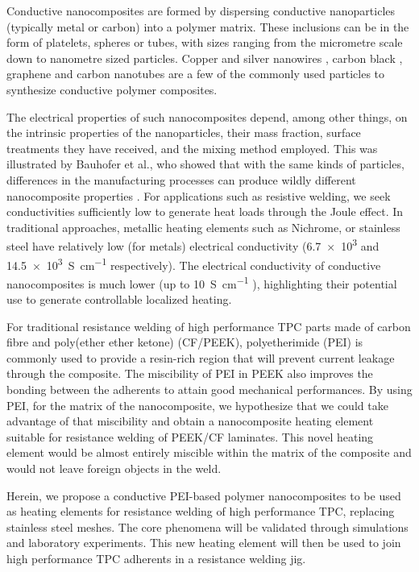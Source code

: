 \documentclass[11pt,review,times]{elsarticle}
\begin{document}
Conductive nanocomposites are formed by dispersing conductive nanoparticles (typically metal or carbon) into a polymer matrix. 
These inclusions can be in the form of platelets, spheres or tubes, with sizes ranging from the micrometre scale down to nanometre sized particles. 
Copper and silver nanowires \cite{Gelves2008a, Al-Saleh2011, Li2015a, Riviere2016, DermanakiFarahani2016, Cauchy2017}, carbon black \cite{Jin2013, MohdRadzuan2017}, graphene \cite{Jiang2012a, Hu2014a} and carbon nanotubes \cite{Diez-Pascual2011,Huegun2013,Kazakova2014,Jia2015} are a few of the commonly used particles to synthesize conductive polymer composites.

The electrical properties of such nanocomposites depend, among other things, on the intrinsic properties of the nanoparticles, their mass fraction, surface treatments they have received, and the mixing method employed. 
This was illustrated by Bauhofer et al., who showed that with the same kinds of particles, differences in the manufacturing processes can produce wildly different nanocomposite properties \cite{Bauhofer2009}. 
For applications such as resistive welding, we seek conductivities sufficiently low to generate heat loads through the Joule effect. 
In traditional approaches, metallic heating elements such as Nichrome, or stainless steel have relatively low (for metals) electrical conductivity (\num{6.7e3} and \SI{14.5e3}{\siemens\per\centi\metre} respectively). 
The electrical conductivity of conductive nanocomposites is much lower (up to \SI{10}{\siemens\per\centi\metre} \cite{Grossiord2008a}), highlighting their potential use to generate controllable localized heating\cite{Pyo2016}. 

For traditional resistance welding of high performance TPC parts made of carbon fibre and poly(ether ether ketone) (CF/PEEK), polyetherimide (PEI) is commonly used to provide a resin-rich region that will prevent current leakage through the composite. 
The miscibility of PEI in PEEK \cite{Crevecoeur1991} also improves the bonding between the adherents to attain good mechanical performances. 
By using PEI, for the matrix of the nanocomposite, we hypothesize that we could take advantage of that miscibility and obtain a nanocomposite heating element suitable for resistance welding of PEEK/CF laminates. 
This novel heating element would be almost entirely miscible within the matrix of the composite and would not leave foreign objects in the weld. 

Herein, we propose a conductive PEI-based polymer nanocomposites to be used as heating elements for resistance welding of high performance TPC, replacing stainless steel meshes. 
The core phenomena will be validated through simulations and laboratory experiments. 
This new heating element will then be used to join high performance TPC adherents in a resistance welding jig. 
\end{document}
